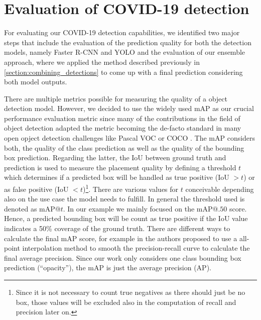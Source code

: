 \section{Evaluation of COVID-19 detection}\label{chapter:eval_rcnn_yolo}
For evaluating our COVID-19 detection capabilities, we identified two major steps that include the evaluation of the prediction quality for both the detection models, namely Faster \ac{R-CNN} and \ac{YOLO} and the evaluation of our ensemble approach, where we applied the method described previously in \ref{section:combining_detections} to come up with a final prediction considering both model outputs. 

There are multiple metrics possible for measuring the quality of a object detection model. However, we decided to use the widely used \acl{mAP} as our crucial performance evaluation metric since many of the contributions in the field of object detection adapted the metric becoming the de-facto standard in many open opject detection challenges like Pascal VOC \autocite{everingham2010pascal} or COCO \autocite{coco}. The \ac{mAP} considers both, the quality of the class prediction as well as the quality of the bounding box prediction. Regarding the latter, the \ac{IoU} between ground truth and prediction is used to measure the placement quality by defining a threshold $t$ which determines if a predicted box will be handled as true positive (\ac{IoU} $> t$) or as false positive (\ac{IoU} $< t$)\footnote{Since it is not necessary to count true negatives as there should just be no box, those values will be excluded also in the computation of recall and precision later on.}. There are various values for $t$ conceivable depending also on the use case the model needs to fulfill. In general the threshold used is denoted as \ac{mAP}@$t$. In our example we mainly focused on the \ac{mAP}@$.50$ score. Hence, a predicted bounding box will be count as true positive if the \ac{IoU} value indicates a 50\% coverage of the ground truth. There are different ways to calculate the final \ac{mAP} score, for example in \autocite{padilla2020survey} the authors proposed to use a all-point interpolation method to smooth the precision-recall curve to calculate the final average precision. Since our work only considers one class bounding box prediction (\enquote{opacity}), the \ac{mAP} is just the average precision (AP).

